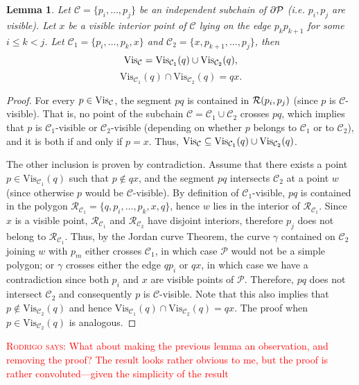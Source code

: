 \documentclass[a4paper]{article}
\newtheorem{lemma}{Lemma}
\newcommand{\regone}{\ensuremath{{{\mathcal R_{\mathcal C_{1}}}}}}
\newcommand{\regtwo}{\ensuremath{{{\mathcal R_{\mathcal C_{2}}}}}}
\newcommand{\marrow}{\marginpar[\hfill$\longrightarrow$]{$\longleftarrow$}}
\newcommand{\remark}[2]{\textcolor{red}{\textsc{#1 says:} \marrow\textsf{#2}}}
\newcommand{\rodrigo}[1]{\remark{Rodrigo}{#1}}
\begin{document}
\iffalse
\begin{lemma}\label{DivideLemma}
Let $\mathcal C = \{p_i, \ldots, p_j\}$ be an independent subchain of $\partial \mathcal{P}$ (i.e. $p_i, p_j$ are visible).
Let $x$ be a visible interior point of $\mathcal C$ lying on the edge $p_k p_{k+1}$ for some $i\leq k< j$.
Let $\mathcal C_1 = \{p_i, \ldots, p_k, x\}$ and $\mathcal C_2 = \{x, p_{k+1}, \ldots, p_j\}$,
then $$\mathrm{Vis}_{\mathcal{C}} = \mathrm{Vis}_{\mathcal C_1}(q) \cup \mathrm{Vis}_{\mathcal C_2}(q),$$ 
$$\mathrm{Vis}_{\mathcal C_1}(q) \cap \mathrm{Vis}_{\mathcal C_2}(q) = qx.$$
\end{lemma}
\begin{proof}
For every $p\in \mathrm{Vis}_{\mathcal{C}}$, the segment $pq$ is contained in ${{\mathcal R}}(p_i, p_j)$ (since $p$ is $\mathcal C$-visible).
That is, no point of the subchain $\mathcal C =\mathcal C_1\cup \mathcal C_2$ crosses $pq$, 
which implies that $p$ is $\mathcal C_1$-visible or $\mathcal C_2$-visible (depending on whether $p$ belongs to $\mathcal C_1$ or to $\mathcal C_2$), and it is both if and only if $p=x$. Thus, $\mathrm{Vis}_{\mathcal{C}} \subseteq \mathrm{Vis}_{\mathcal C_1}(q) \cup \mathrm{Vis}_{\mathcal C_2}(q)$.

The other inclusion is proven by contradiction. Assume that there exists a point $p\in \mathrm{Vis}_{\mathcal C_1}(q)$ such that $p\notin qx$, and the segment $pq$ intersects $\mathcal C_2$ at a point $w$ (since otherwise $p$ would be $\mathcal C$-visible). By definition of $\mathcal C_1$-visible, $pq$ is contained in the polygon $\regone = \{q, p_i, \ldots, p_{k}, x, q\}$, hence $w$ lies in the interior of $\regone$. Since $x$ is a visible point, $\regone$ and $\regtwo$ have disjoint interiors, therefore $p_j$ does not belong to $\regone$.
Thus, by the Jordan curve Theorem, 
the curve $\gamma$ contained on $\mathcal C_2$ joining $w$ with $p_m$ either crosses $\mathcal C_1$, in which case $\mathcal P$ would not be a simple polygon; or $\gamma$ crosses either the edge $qp_i$ or $qx$, in which case we have a contradiction since both $p_i$ and $x$ are visible points of $\mathcal P$.
Therefore, $pq$ does not intersect $\mathcal C_2$ and consequently $p$ is $\mathcal C$-visible. 
Note that this also implies that $p\notin \mathrm{Vis}_{\mathcal C_2}(q)$ and hence $\mathrm{Vis}_{\mathcal C_1}(q) \cap \mathrm{Vis}_{\mathcal C_2}(q) = qx$.
The proof when $p\in \mathrm{Vis}_{\mathcal C_2}(q)$ is analogous.
\end{proof}
\rodrigo{What about making the previous lemma an observation, and removing the proof? The result looks rather obvious to me, but the proof is rather convoluted---given the simplicity of the result}
\end{document}
